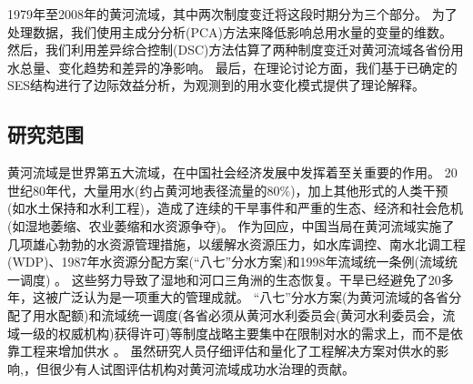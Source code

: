 
1979年至2008年的黄河流域，其中两次制度变迁将这段时期分为三个部分。
为了处理数据，我们使用主成分分析(PCA)方法来降低影响总用水量的变量的维数。
然后，我们利用差异综合控制(DSC)方法\cite{arkhangelsky2021}估算了两种制度变迁对黄河流域各省份用水总量、变化趋势和差异的净影响。
最后，在理论讨论方面，我们基于已确定的SES结构进行了边际效益分析，为观测到的用水变化模式提供了理论解释。



\subsection{研究范围}\label{sec:yrb}

黄河流域是世界第五大流域，在中国社会经济发展中发挥着至关重要的作用。
20世纪80年代，大量用水(约占黄河地表径流量的$80\%$)，加上其他形式的人类干预(如水土保持和水利工程)，造成了连续的干旱事件和严重的生态、经济和社会危机(如湿地萎缩、农业萎缩和水资源争夺)。
作为回应，中国当局在黄河流域实施了几项雄心勃勃的水资源管理措施，以缓解水资源压力，如水库调控、南水北调工程(WDP)、1987年水资源分配方案(“八七”分水方案)和1998年流域统一条例(流域统一调度) \cite{long2020, wang2019d}。
这些努力导致了湿地和河口三角洲的生态恢复。干旱已经避免了20多年，这被广泛认为是一项重大的管理成就。
“八七”分水方案(为黄河流域的各省分配了用水配额)和流域统一调度(各省必须从黄河水利委员会(黄河水利委员会，流域一级的权威机构)获得许可)等制度战略主要集中在限制对水的需求上，而不是依靠工程来增加供水 \cite{bouckaert2022, speed2013}。
虽然研究人员仔细评估和量化了工程解决方案对供水的影响\cite{long2020},，但很少有人试图评估机构对黄河流域成功水治理的贡献。

